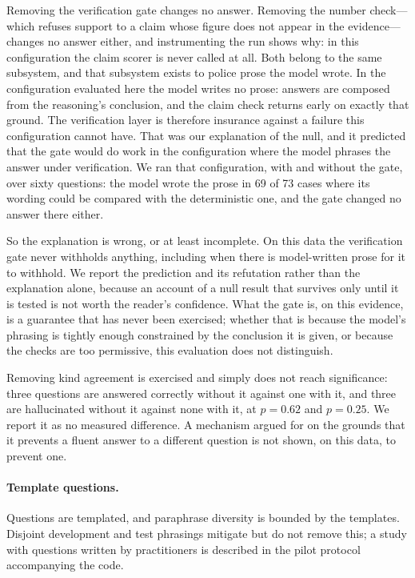 \documentclass[11pt]{article}
\begin{document}
Removing the verification gate changes no answer. Removing the number check---which
refuses support to a claim whose figure does not appear in the evidence---changes no
answer either, and instrumenting the run shows why: in this configuration the claim
scorer is never called at all. Both belong to the same subsystem, and that subsystem
exists to police prose the model wrote. In the configuration evaluated here the model
writes no prose: answers are composed from the reasoning's conclusion, and the
claim check returns early on exactly that ground. The verification layer is therefore
insurance against a failure this configuration cannot have. That was our explanation of
the null, and it predicted that the gate would do work in the configuration where the
model phrases the answer under verification. We ran that configuration, with and without
the gate, over sixty questions: the model wrote the prose in 69 of 73 cases where its
wording could be compared with the deterministic one, and the gate changed no answer
there either.

So the explanation is wrong, or at least incomplete. On this data the verification gate
never withholds anything, including when there is model-written prose for it to withhold.
We report the prediction and its refutation rather than the explanation alone, because an
account of a null result that survives only until it is tested is not worth the reader's
confidence. What the gate is, on this evidence, is a guarantee that has never been
exercised; whether that is because the model's phrasing is tightly enough constrained by
the conclusion it is given, or because the checks are too permissive, this evaluation does
not distinguish.

Removing kind agreement is exercised and simply does not reach significance: three
questions are answered correctly without it against one with it, and three are
hallucinated without it against none with it, at $p=0.62$ and $p=0.25$. We report it as
no measured difference. A mechanism argued for on the grounds that it prevents a fluent
answer to a different question is not shown, on this data, to prevent one.
\paragraph{Template questions.} Questions are templated, and paraphrase diversity is bounded
by the templates. Disjoint development and test phrasings mitigate but do not remove this;
a study with questions written by practitioners is described in the pilot protocol
accompanying the code.
\end{document}
